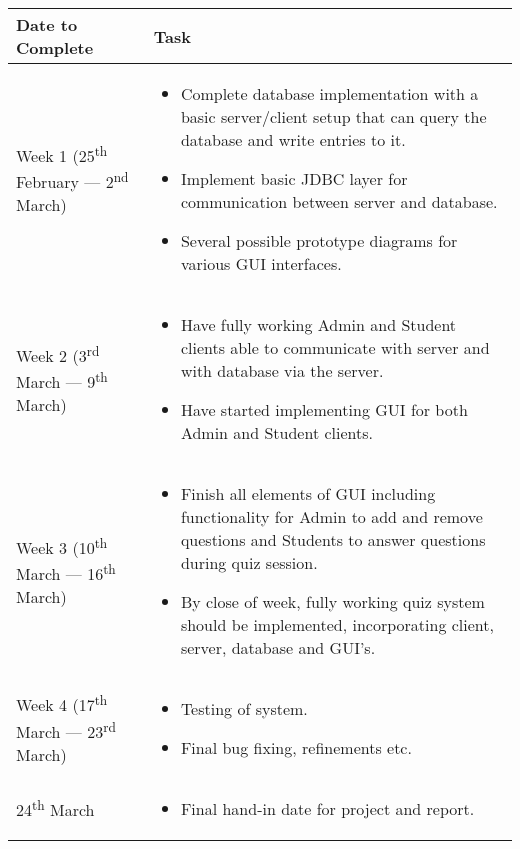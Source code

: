 \documentclass[a4paper,10pt]{article}
\newcommand{\ts}{\textsuperscript}
\begin{document}
\begin{longtabu}{p{0.33\textwidth}X}
	\toprule
	\textbf{Date to Complete} & \textbf{Task} \\
	\midrule
	Week 1 \newline (25\ts{th} February --- 2\ts{nd} March) &
	\begin{itemize}
		\item Complete database implementation with a basic server/client setup
			that can query the database and write entries to it.
		\item Implement basic JDBC layer for communication between server and
			database.
		\item Several possible prototype diagrams for various GUI interfaces.
	\end{itemize}\\

	Week 2 \newline (3\ts{rd} March --- 9\ts{th} March) &
	\begin{itemize}
		\item Have fully working Admin and Student clients able to communicate
			with server and with database via the server.
		\item Have started implementing GUI for both Admin and Student clients.
	\end{itemize} \\

	Week 3 \newline (10\ts{th} March --- 16\ts{th} March) &
	\begin{itemize}
		\item Finish all elements of GUI including functionality for Admin to
			add and remove questions and Students to answer questions during
			quiz session.
		\item By close of week, fully working quiz system should be
			implemented, incorporating client, server, database and GUI's.
	\end{itemize} \\

	Week 4 \newline (17\ts{th} March --- 23\ts{rd} March) &
	\begin{itemize}
		\item Testing of system.
		\item Final bug fixing, refinements etc.
	\end{itemize} \\

	24\ts{th} March &
	\begin{itemize}
		\item Final hand-in date for project and report.
	\end{itemize} \\
	\bottomrule
\end{longtabu}
\end{document}
